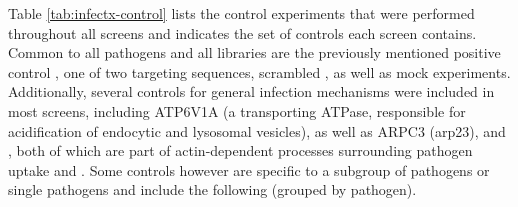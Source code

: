 Table \ref{tab:infectx-control} lists the  control experiments that were performed throughout all screens and indicates the set of controls each screen contains. Common to all pathogens and all libraries are the previously mentioned positive control , one of two  targeting sequences, scrambled , as well as mock experiments. Additionally, several controls for general infection mechanisms were included in most screens, including ATP6V1A (a  transporting ATPase, responsible for acidification of endocytic and lysosomal vesicles), as well as ARPC3 (\acrshort{arp23}), and , both of which are part of actin-dependent processes surrounding pathogen uptake and . Some controls however are specific to a subgroup of pathogens or single pathogens and include the following (grouped by pathogen).
